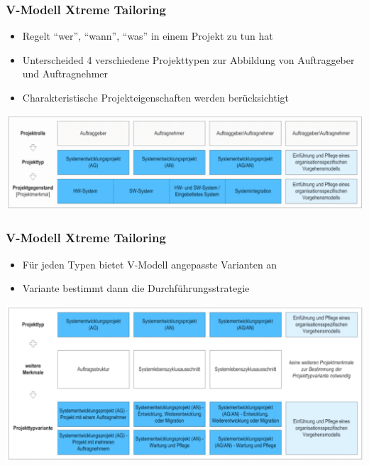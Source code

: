 \begin{frame}
\frametitle{V-Modell Xtreme Tailoring}
	\begin{itemize}
		\item Regelt ``wer'', ``wann'', ``was'' in einem Projekt zu tun hat
		\item Unterscheided 4 verschiedene Projekttypen zur Abbildung von
		Auftraggeber und Auftragnehmer
		\item Charakteristische Projekteigenschaften werden berücksichtigt
	\end{itemize}
	\center\includegraphics[width=1\textwidth,
			keepaspectratio=true]{bilder/vmodell_typen.png}
\end{frame}

\begin{frame}
\frametitle{V-Modell Xtreme Tailoring}
	\begin{itemize}
		\item Für jeden Typen bietet V-Modell angepasste Varianten an
		\item Variante bestimmt dann die Durchführungsstrategie
	\end{itemize}
	\center\includegraphics[width=1\textwidth,
			keepaspectratio=true]{bilder/vmodell_typen_varianten.png}
\end{frame}

